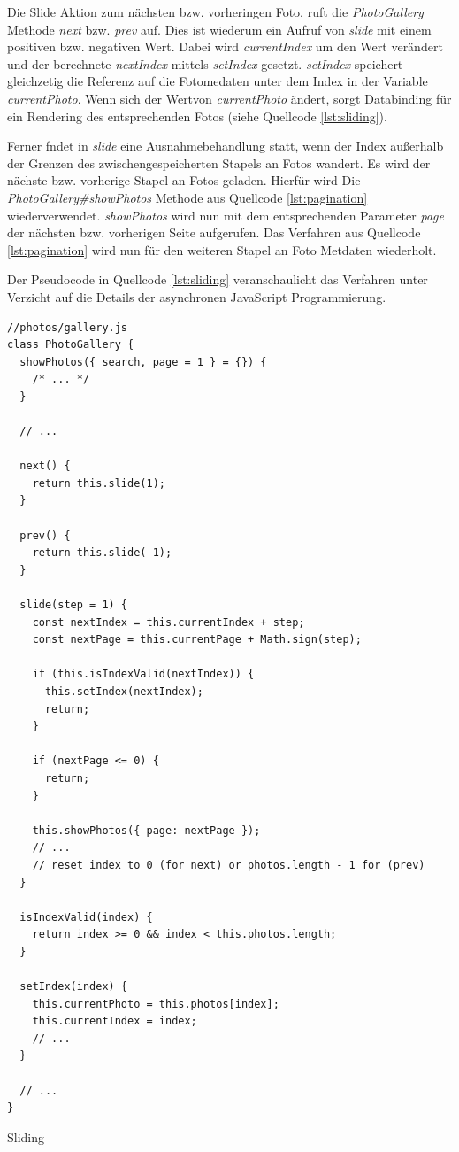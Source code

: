 Die Slide Aktion zum nächsten bzw. vorheringen Foto, ruft die \emph{PhotoGallery} Methode \emph{next} bzw. \emph{prev} auf. Dies ist wiederum ein Aufruf von \emph{slide} mit einem positiven bzw. negativen Wert. Dabei wird \emph{currentIndex} um den Wert verändert und der berechnete \emph{nextIndex} mittels \emph{setIndex} gesetzt. \emph{setIndex} speichert gleichzetig die Referenz auf die Fotomedaten unter dem Index in der Variable \emph{currentPhoto}. Wenn sich der Wertvon \emph{currentPhoto} ändert, sorgt Databinding für ein Rendering des entsprechenden Fotos (siehe Quellcode \ref{lst:sliding}).

 Ferner fndet in \emph{slide} eine Ausnahmebehandlung statt, wenn der Index außerhalb der Grenzen des zwischengespeicherten Stapels an Fotos wandert. Es wird der nächste bzw. vorherige Stapel an Fotos geladen. Hierfür wird Die \emph{PhotoGallery\#showPhotos} Methode aus Quellcode \ref{lst:pagination} wiederverwendet. \emph{showPhotos} wird nun mit dem entsprechenden Parameter \emph{page} der nächsten bzw. vorherigen Seite aufgerufen. Das Verfahren aus Quellcode \ref{lst:pagination} wird nun für den weiteren Stapel an Foto Metdaten wiederholt.


Der Pseudocode in Quellcode \ref{lst:sliding} veranschaulicht das Verfahren unter Verzicht auf die Details der asynchronen JavaScript Programmierung.

\begin{listing}[H]
\begin{verbatim}
//photos/gallery.js
class PhotoGallery {
  showPhotos({ search, page = 1 } = {}) {
    /* ... */
  }

  // ...

  next() {
    return this.slide(1);
  }

  prev() {
    return this.slide(-1);
  }

  slide(step = 1) {
    const nextIndex = this.currentIndex + step;
    const nextPage = this.currentPage + Math.sign(step);

    if (this.isIndexValid(nextIndex)) {
      this.setIndex(nextIndex);
      return;
    }

    if (nextPage <= 0) {
      return;
    }

    this.showPhotos({ page: nextPage });
    // ...
    // reset index to 0 (for next) or photos.length - 1 for (prev)
  }

  isIndexValid(index) {
    return index >= 0 && index < this.photos.length;
  }

  setIndex(index) {
    this.currentPhoto = this.photos[index];
    this.currentIndex = index;
    // ...
  }

  // ...
}

\end{verbatim}
\caption{Sliding}
\label{lst:sliding}
\end{listing}
